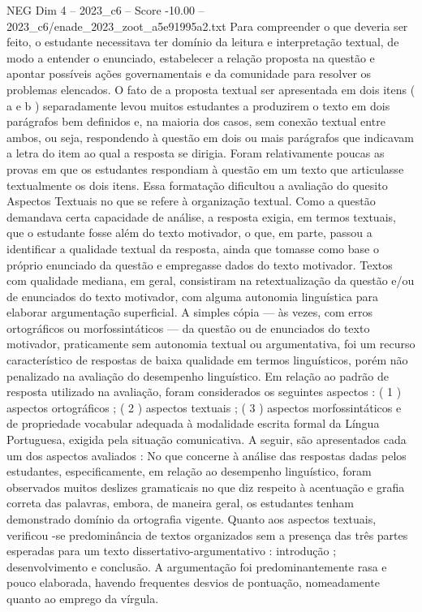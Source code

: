 \begin{textsample}{NEG Dim 4 – 2023\_c6 – Score -10.00 – 2023\_c6/enade\_2023\_zoot\_a5e91995a2.txt}
Para compreender o que deveria ser feito, o estudante necessitava ter domínio da leitura e interpretação textual, de modo a entender o enunciado, estabelecer a relação proposta na questão e apontar possíveis ações governamentais e da comunidade para resolver os problemas elencados.
O fato de a proposta textual ser apresentada em dois itens ( a e b ) separadamente levou muitos estudantes a produzirem o texto em dois parágrafos bem definidos e, na maioria dos casos, sem conexão textual entre ambos, ou seja, respondendo à questão em dois ou mais parágrafos que indicavam a letra do item ao qual a resposta se dirigia.
Foram relativamente poucas as provas em que os estudantes respondiam à questão em um texto que articulasse textualmente os dois itens.
Essa formatação dificultou a avaliação do quesito Aspectos Textuais no que se refere à organização textual.
Como a questão demandava certa capacidade de análise, a resposta exigia, em termos textuais, que o estudante fosse além do texto motivador, o que, em parte, passou a identificar a qualidade textual da resposta, ainda que tomasse como base o próprio enunciado da questão e empregasse dados do texto motivador.
Textos com qualidade mediana, em geral, consistiram na retextualização da questão e/ou de enunciados do texto motivador, com alguma autonomia linguística para elaborar argumentação superficial.
A simples cópia — às vezes, com erros ortográficos ou morfossintáticos — da questão ou de enunciados do texto motivador, praticamente sem autonomia textual ou argumentativa, foi um recurso característico de respostas de baixa qualidade em termos linguísticos, porém não penalizado na avaliação do desempenho linguístico.
Em relação ao padrão de resposta utilizado na avaliação, foram considerados os seguintes aspectos : ( 1 ) aspectos ortográficos ; ( 2 ) aspectos textuais ; ( 3 ) aspectos morfossintáticos e de propriedade vocabular adequada à modalidade escrita formal da Língua Portuguesa, exigida pela situação comunicativa.
A seguir, são apresentados cada um dos aspectos avaliados : No que concerne à análise das respostas dadas pelos estudantes, especificamente, em relação ao desempenho linguístico, foram observados muitos deslizes gramaticais no que diz respeito à acentuação e grafia correta das palavras, embora, de maneira geral, os estudantes tenham demonstrado domínio da ortografia vigente.
Quanto aos aspectos textuais, verificou -se predominância de textos organizados sem a presença das três partes esperadas para um texto dissertativo-argumentativo : introdução ; desenvolvimento e conclusão.
A argumentação foi predominantemente rasa e pouco elaborada, havendo frequentes desvios de pontuação, nomeadamente quanto ao emprego da vírgula.

\end{textsample}
